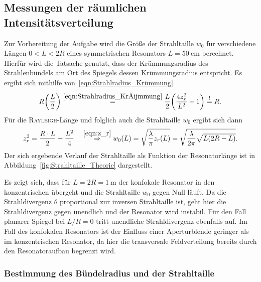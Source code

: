 \documentclass[a4paper,twoside,final]{article}
\begin{document}
\subsection{Messungen der räumlichen Intensitätsverteilung}

Zur Vorbereitung der Aufgabe wird die Größe der Strahltaille $w_0$ für verschiedene Längen $0 < L < 2R$ eines symmetrischen Resonators $L = \SI{50}{\centi\metre}$ berechnet. Hierfür wird die Tatsache genutzt, dass der Krümmungsradius des Strahlenbündels am Ort des Spiegels dessen Krümmungsradius entspricht. Es ergibt sich mithilfe von~\eqref{eqn:Strahlradius_Krümmung}
\begin{align}
  R\qty(\frac{L}{2}) \overset{\eqref{eqn:Strahlradius_Krümmung} }{=} \frac{L}{2} \qty(\frac{4 z_r^2}{L^2} + 1) \overset{!}{=} R.
\end{align}
Für die \textsc{Rayleigh}-Länge und folglich auch die Strahltaille $w_0$ ergibt sich dann
\begin{align}\label{eqn:Strahltaille}
  z_r^2 = \frac{R \cdot L}{2} - \frac{L^2}{4} \quad \overset{\eqref{eqn:z_r}}{\Rightarrow} w_0(L) = \sqrt{\frac{\lambda}{\pi} z_r(L)} = \sqrt{\frac{\lambda}{2\pi}\sqrt{L(2R - L)}}.
\end{align}
Der sich ergebende Verlauf der Strahltaille als Funktion der Resonatorlänge ist in Abbildung~\ref{fig:Strahltaille_Theorie} dargestellt.



Es zeigt sich, dass für $L = 2R = \SI{1}{\metre}$ der konfokale Resonator in den konzentrischen übergeht und die Strahltaille $w_0$ gegen Null läuft. Da die Strahldivergenz $\theta$ proportional zur inversen Strahltaille ist, geht hier die Strahldivergenz gegen unendlich und der Resonator wird instabil. Für den Fall planarer Spiegel bei $L/R = 0$ tritt unendliche Strahldivergenz ebenfalls auf. Im Fall des konfokalen Resonators ist der Einfluss einer Aperturblende geringer als im konzentrischen Resonator, da hier die transversale Feldverteilung bereits durch den Resonatoraufbau begrenzt wird.

\subsubsection{Bestimmung des Bündelradius und der Strahltaille}
\end{document}
